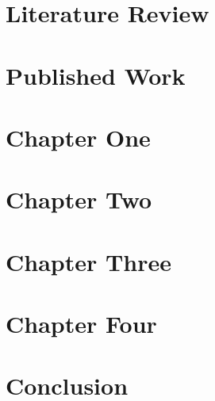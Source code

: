 \documentclass[12pt,dvipsnames]{report}	%
\begin{document}
    \chapter{Literature Review}
    
    
    \chapter{Published Work}
    
    
    \chapter{Chapter One}
     
    
    \chapter{Chapter Two}
    
    
    \chapter{Chapter Three}
    
    
    \chapter{Chapter Four}
    
    
    \chapter{Conclusion}
    
    
    \appendices
    
    \renewcommand\thesection{\Alph{section}}
    
\end{document}
